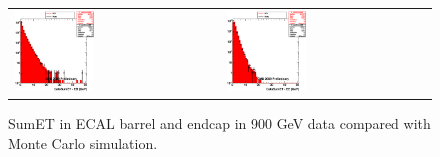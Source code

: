 \begin{figure}[h!]
 \centering
 \begin{tabular}{ll}
  \includegraphics[width=0.40\textwidth]{plots_DataVsMC_MB_900GeV/h_caloSumetEB.eps} &
  \includegraphics[width=0.40\textwidth]{plots_DataVsMC_MB_900GeV/h_caloSumetEE.eps} \\
 \end{tabular}
 \caption{SumET in ECAL barrel and endcap in 900 GeV data compared
   with Monte Carlo simulation.
          \label{fig:DataVsMC_MB_900_4}}
\end{figure}

